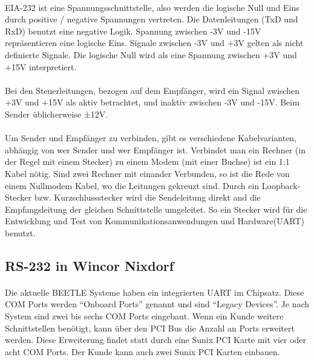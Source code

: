 \paragraph{}
EIA-232 ist eine Spannungsschnittstelle, also werden die logische Null und Eins durch positive / negative Spannungen vertreten. Die Datenleitungen (TxD und RxD) benutzt eine negative Logik. Spannung zwischen -3V und -15V repräsentieren eine logische Eins. Signale zwischen -3V und +3V gelten als nicht definierte Signale. Die logische Null wird als eine Spannung zwischen +3V und +15V interpretiert. 
 
\paragraph{}
Bei den Steuerleitungen, bezogen auf dem Empfänger, wird ein Signal zwischen +3V und +15V als aktiv betrachtet, und inaktiv zwischen -3V und -15V. Beim Sender üblicherweise ±12V.

\paragraph{}
Um Sender und Empfänger zu verbinden, gibt es verschiedene Kabelvarianten, abhängig von wer Sender und wer Empfänger ist. Verbindet man ein Rechner (in der Regel mit einem Stecker) zu einem Modem (mit einer Buchse) ist ein 1:1 Kabel nötig. Sind zwei Rechner mit einander Verbunden, so ist die Rede von einem Nullmodem Kabel, wo die Leitungen gekreuzt sind. Durch ein Loopback-Stecker bzw. Kurzschlussstecker wird die Sendeleitung direkt and die Empfangsleitung der gleichen Schnittstelle umgeleitet. So ein Stecker wird für die Entwicklung und Test von Kommunikationsanwendungen und Hardware(UART) benutzt.


\subsection{RS-232 in Wincor Nixdorf}
\paragraph{}
Die aktuelle BEETLE Systeme haben ein integrierten UART im Chipsatz. Diese COM Ports werden "`Onboard Ports"' genannt und sind "`Legacy Devices"'. Je nach System sind zwei bis sechs COM Ports eingebaut. Wenn ein Kunde weitere Schnittstellen benötigt, kann über den PCI Bus die Anzahl an Ports erweitert werden. Diese Erweiterung findet statt durch eine Sunix PCI Karte mit vier oder acht COM Ports. Der Kunde kann auch zwei Sunix PCI Karten einbauen.
 
